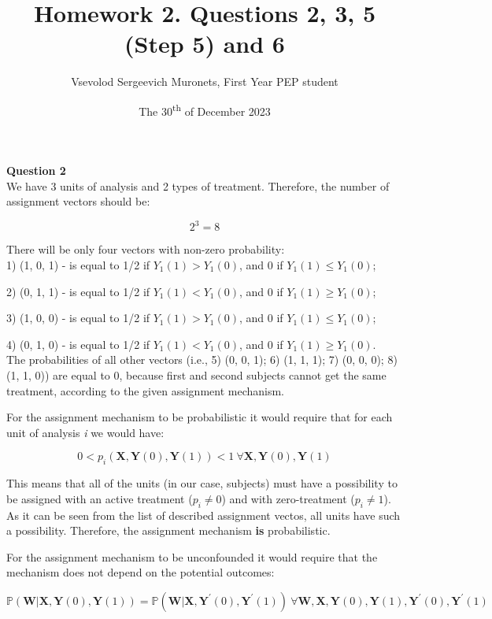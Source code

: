 \documentclass{article}
\title{Homework 2. Questions 2, 3, 5 (Step 5) and 6}
\author{Vsevolod Sergeevich Muronets, First Year PEP student}
\date{The 30\textsuperscript{th} of December 2023}
\begin{document}
\maketitle

\textbf{Question 2}
\\

We have 3 units of analysis and 2 types of treatment. Therefore, the number of assignment vectors should be:

$$2^3=8$$

There will be only four vectors with non-zero probability:
\\

1) (1, 0, 1) - is equal to 1/2 if $Y_1(1)>Y_1(0)$, and 0 if $Y_1(1) \leq Y_1(0)$;

2) (0, 1, 1) - is equal to 1/2 if $Y_1(1)<Y_1(0)$, and 0 if $Y_1(1) \geq Y_1(0)$;

3) (1, 0, 0) - is equal to 1/2 if $Y_1(1)>Y_1(0)$, and 0 if $Y_1(1) \leq Y_1(0)$;

4) (0, 1, 0) - is equal to 1/2 if $Y_1(1)<Y_1(0)$, and 0 if $Y_1(1) \geq Y_1(0)$.
\\

The probabilities of all other vectors (i.e., 5) (0, 0, 1); 6) (1, 1, 1); 7) (0, 0, 0); 8) (1, 1, 0)) are equal to 0, because first and second subjects cannot get the same treatment, according to the given assignment mechanism.

For the assignment mechanism to be probabilistic it would require that for each unit of analysis \textit{i} we would have:

$$0 < \mathit{p_i} (\mathbf{X}, \mathbf{Y}(0), \mathbf{Y}(1)) < 1\ \forall \mathbf{X}, \mathbf{Y} (0), \mathbf{Y}(1)$$

This means that all of the units (in our case, subjects) must have a possibility to be assigned with an active treatment ($p_i \neq 0$) and with zero-treatment ($p_i \neq 1$). As it can be seen from the list of described assignment vectos, all units have such a possibility. Therefore, the assignment mechanism \textbf{is} probabilistic.

For the assignment mechanism to be unconfounded it would require that the mechanism does not depend on the potential outcomes:

$$\mathbb{P}(\mathbf{W}|\mathbf{X}, \mathbf{Y}(0), \mathbf{Y}(1)) = \mathbb{P}(\mathbf{W}|\mathbf{X}, \mathbf{Y}^\prime (0), \mathbf{Y}^\prime (1))\ \forall\mathbf{W}, \mathbf{X}, \mathbf{Y}(0), \mathbf{Y}(1), \mathbf{Y}^\prime (0), \mathbf{Y}^\prime (1)$$
\end{document}
